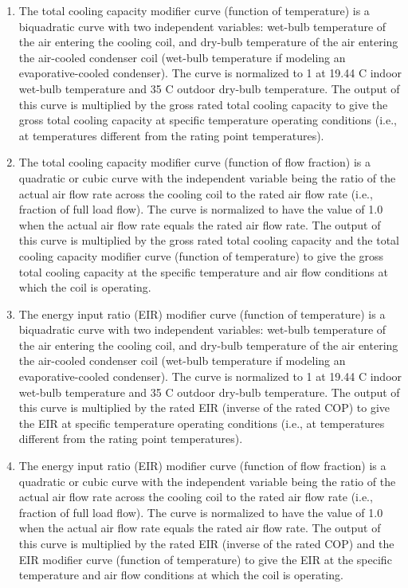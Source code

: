 \begin{enumerate}
\def\labelenumi{\arabic{enumi}.}
\item
  The total cooling capacity modifier curve (function of temperature) is a biquadratic curve with two independent variables: wet-bulb temperature of the air entering the cooling coil, and dry-bulb temperature of the air entering the air-cooled condenser coil (wet-bulb temperature if modeling an evaporative-cooled condenser). The curve is normalized to 1 at 19.44 C indoor wet-bulb temperature and 35 C outdoor dry-bulb temperature. The output of this curve is multiplied by the gross rated total cooling capacity to give the gross total cooling capacity at specific temperature operating conditions (i.e., at temperatures different from the rating point temperatures).
\item
  The total cooling capacity modifier curve (function of flow fraction) is a quadratic or cubic curve with the independent variable being the ratio of the actual air flow rate across the cooling coil to the rated air flow rate (i.e., fraction of full load flow). The curve is normalized to have the value of 1.0 when the actual air flow rate equals the rated air flow rate. The output of this curve is multiplied by the gross rated total cooling capacity and the total cooling capacity modifier curve (function of temperature) to give the gross total cooling capacity at the specific temperature and air flow conditions at which the coil is operating.
\item
  The energy input ratio (EIR) modifier curve (function of temperature) is a biquadratic curve with two independent variables: wet-bulb temperature of the air entering the cooling coil, and dry-bulb temperature of the air entering the air-cooled condenser coil (wet-bulb temperature if modeling an evaporative-cooled condenser). The curve is normalized to 1 at 19.44 C indoor wet-bulb temperature and 35 C outdoor dry-bulb temperature. The output of this curve is multiplied by the rated EIR (inverse of the rated COP) to give the EIR at specific temperature operating conditions (i.e., at temperatures different from the rating point temperatures).
\item
  The energy input ratio (EIR) modifier curve (function of flow fraction) is a quadratic or cubic curve with the independent variable being the ratio of the actual air flow rate across the cooling coil to the rated air flow rate (i.e., fraction of full load flow). The curve is normalized to have the value of 1.0 when the actual air flow rate equals the rated air flow rate. The output of this curve is multiplied by the rated EIR (inverse of the rated COP) and the EIR modifier curve (function of temperature) to give the EIR at the specific temperature and air flow conditions at which the coil is operating.

\end{enumerate}
